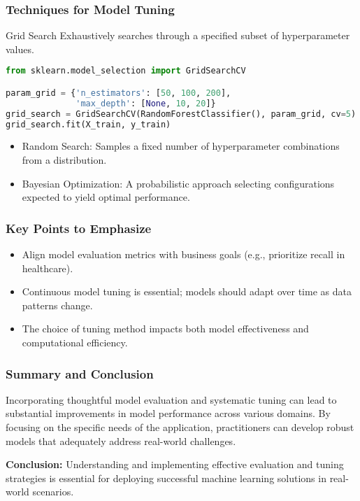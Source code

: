 \documentclass[aspectratio=169]{beamer}
\begin{document}
\begin{frame}[fragile]
    \frametitle{Techniques for Model Tuning}
    \begin{block}{Grid Search}
        Exhaustively searches through a specified subset of hyperparameter values. 
        \begin{lstlisting}[language=Python]
from sklearn.model_selection import GridSearchCV

param_grid = {'n_estimators': [50, 100, 200],
              'max_depth': [None, 10, 20]}
grid_search = GridSearchCV(RandomForestClassifier(), param_grid, cv=5)
grid_search.fit(X_train, y_train)
        \end{lstlisting}
    \end{block}
    
    \begin{itemize}
        \item Random Search: Samples a fixed number of hyperparameter combinations from a distribution.
        \item Bayesian Optimization: A probabilistic approach selecting configurations expected to yield optimal performance.
    \end{itemize}
\end{frame}

\begin{frame}[fragile]
    \frametitle{Key Points to Emphasize}
    \begin{itemize}
        \item Align model evaluation metrics with business goals (e.g., prioritize recall in healthcare).
        \item Continuous model tuning is essential; models should adapt over time as data patterns change.
        \item The choice of tuning method impacts both model effectiveness and computational efficiency.
    \end{itemize}
\end{frame}

\begin{frame}[fragile]
    \frametitle{Summary and Conclusion}
    Incorporating thoughtful model evaluation and systematic tuning can lead to substantial improvements in model performance across various domains. By focusing on the specific needs of the application, practitioners can develop robust models that adequately address real-world challenges.

    \textbf{Conclusion:} Understanding and implementing effective evaluation and tuning strategies is essential for deploying successful machine learning solutions in real-world scenarios.
\end{frame}
\end{document}
